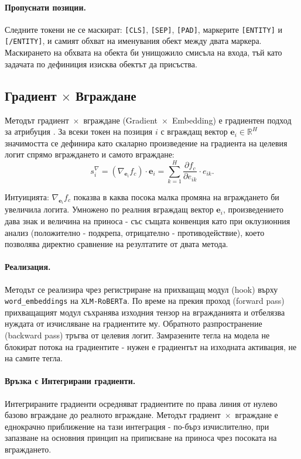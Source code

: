 \documentclass[12pt,a4paper]{report}
\begin{document}
\paragraph{Пропуснати позиции.} Следните токени не се маскират: \texttt{[CLS]}, \texttt{[SEP]}, \texttt{[PAD]}, маркерите \texttt{[ENTITY]} и \texttt{[/ENTITY]}, и самият обхват на именувания обект между двата маркера. Маскирането на обхвата на обекта би унищожило смисъла на входа, тъй като задачата по дефиниция изисква обектът да присъства.


\subsection{Градиент $\times$ Вграждане}

Методът градиент~$\times$~вграждане (Gradient~$\times$~Embedding) е градиентен подход за атрибуция \cite{simonyan2014gradient, li2016visualizing}. За всеки токен на позиция $i$ с вграждащ вектор $\mathbf{e}_i \in \mathbb{R}^H$ значимостта се дефинира като скаларно произведение на градиента на целевия логит спрямо вграждането и самото вграждане:
\begin{equation}
  s_i^{\nabla} = \left(\nabla_{\mathbf{e}_i} f_c\right) \cdot \mathbf{e}_i = \sum_{k=1}^{H} \frac{\partial f_c}{\partial e_{ik}} \cdot e_{ik}.
  \label{eq:grad_emb}
\end{equation}

Интуицията: $\nabla_{\mathbf{e}_i} f_c$ показва в каква посока малка промяна на вграждането би увеличила логита. Умножено по реалния вграждащ вектор $\mathbf{e}_i$, произведението дава знак и величина на приноса - със същата конвенция като при оклузионния анализ (положително - подкрепа, отрицателно - противодействие), което позволява директно сравнение на резултатите от двата метода.

\paragraph{Реализация.} Методът се реализира чрез регистриране на прихващащ модул (hook) върху \texttt{word\_embeddings} на \texttt{XLM-RoBERTa}. По време на прекия проход (forward pass) прихващащият модул съхранява изходния тензор на вгражданията и отбелязва нуждата от изчисляване на градиентите му. Обратното разпространение (backward pass) тръгва от целевия логит. Замразените тегла на модела не блокират потока на градиентите - нужен е градиентът на изходната активация, не на самите тегла.

\paragraph{Връзка с Интегрирани градиенти.} Интегрираните градиенти \cite{sundararajan2017ig} осредняват градиентите по права линия от нулево базово вграждане до реалното вграждане. Методът градиент~$\times$~вграждане е еднокрачно приближение на тази интеграция - по-бърз изчислително, при запазване на основния принцип на приписване на приноса чрез посоката на вграждането.
\end{document}
